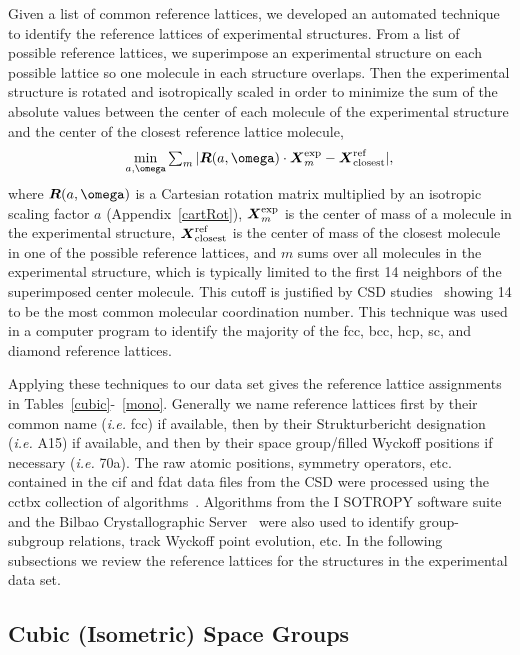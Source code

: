 \documentclass[preprint]{iucr}              %
\newcommand{\mb}[1]{\ensuremath{\mbox{\boldmath $ #1 $}}}
\newcommand{\mbss}[1]{\ensuremath{\mbox{\boldmath $ \scriptstyle #1 $}}}
\begin{document}
Given a list of common reference lattices, we developed an automated
technique to identify the reference lattices of experimental
structures. From a list of possible reference lattices, we
superimpose an experimental structure on each possible lattice so
one molecule in each structure overlaps. Then the experimental
structure is rotated and isotropically scaled in order to minimize
the sum of the absolute values between the center of each molecule
of the experimental structure and the center of the closest
reference lattice molecule,
\begin{equation}
\min_{a,\mbss{\omega}}\sum_m|\mb{R}(a,\mb{\omega})\cdot\mb{X}^{\mathrm{exp}}_m
 - \mb{X}^{\mathrm{ref}}_{\mathrm{closest}}|,
\end{equation}
where $\mb{R}(a,\mb{\omega})$ is a Cartesian rotation matrix
multiplied by an isotropic scaling factor $a$
(Appendix~\ref{cartRot}), $\mb{X}^{\mathrm{exp}}_m$ is the center of
mass of a molecule in the experimental structure,
$\mb{X}^{\mathrm{ref}}_{\mathrm{closest}}$ is the center of mass of
the closest molecule in one of the possible reference lattices, and
$m$ sums over all molecules in the experimental structure, which is
typically limited to the first 14 neighbors of the superimposed
center molecule.  This cutoff is justified by CSD
studies~\cite{Peresypkina00} showing 14 to be the most common
molecular coordination number. This technique was used in a computer
program to identify the majority of the fcc, bcc, hcp, sc, and
diamond reference lattices.

Applying these techniques to our data set gives the reference
lattice assignments in Tables~\ref{cubic}-~\ref{mono}. Generally we
name reference lattices first by their common name (\emph{i.e.} fcc)
if available, then by their Strukturbericht designation (\emph{i.e.}
A15) if available, and then by their space group/filled Wyckoff
positions if necessary (\emph{i.e.} 70a).  The raw atomic positions,
symmetry operators, etc. contained in the cif and fdat data files
from the CSD were processed using the cctbx collection of
algorithms~\cite{Grosse-Kunstleve02}. Algorithms from the I{\small
SOTROPY} software suite~\cite{Stokes02b} and the Bilbao
Crystallographic Server~\cite{Kroumova03} were also used to identify
group-subgroup relations, track Wyckoff point evolution, etc. In the
following subsections we review the reference lattices for the
structures in the experimental data set.

\subsection{Cubic (Isometric) Space Groups}
\end{document}

